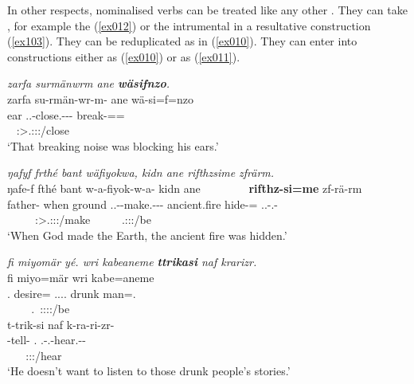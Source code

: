 In other respects, nominalised verbs can be treated like any other . They can take , for example the  (\ref{ex012}) or the intrumental in a resultative construction (\ref{ex103}). They can be reduplicated as in (\ref{ex010}). They can enter into  constructions either as  (\ref{ex010}) or as  (\ref{ex011}).

\begin{exe}
	\ex \textit{zarfa surmänwrm ane \textbf{wäsifnzo}.}\\
	\glll zarfa su-rmän-wr-m-\Zero{} ane wä-si=f=nzo\\
	ear \Tsg.\Masc.\Betatwo-close.\Ext-\Ndu-\Dur-\Stnsg{} \Dem{} break-\Nmlz{}=\Erg{}=\Only{}\\
	~ {\Stsg:\Sbj>\Tsg.\Masc:\Obj:\Pst:\Dur/close} ~ ~\\
	\trans `That breaking noise was blocking his ears.' 
	\label{ex012}
\end{exe}
\begin{exe}
	\ex \emph{ŋafyf frthé bant wäfiyokwa, kidn ane rifthzsime zfrärm.}\\
	\glll ŋafe-f fthé bant w-a-fiyok-w-a-\Zero{} kidn ane~~~~~~~~  \textbf{rifthz-si=me} zf-rä-rm\\
	father-\Erg{} when ground \Tsg.\F.\Alph-\Vc-make.\Ext-\Ndu-\Pst-\Stsg{} ancient.fire \Dem{} hide-\Nmlz{}=\Ins{} \Tsg.\F.\Betatwo-\Cop.\Ndu-\Dur\\
	~ ~ ~ {\Stsg:\Sbj>\Tsg.\F:\Obj:\Pst:\Ipfv/make} ~ ~ ~ {\Tsg.\F:\Sbj:\Pst:\Dur/be}\\
	\trans `When God made the Earth, the ancient fire was hidden.'\\ 
	\label{ex103}
\end{exe}
\begin{exe}
	\ex \textit{fi miyomär yé. wri kabeaneme \textbf{ttrikasi} naf krarizr.}\\
	\glll fi miyo=mär  wri kabe=aneme\\
	\Third{}.\Abs{} desire=\Priv{} \Tsg.\Masc.\Alph.\Cop.\Ndu{} drunk man=\Poss{}.\Nsg{}\\
	~ ~ {\Tsg~.\Masc~:\Alph:\Sbj:\Nonpast:\Ipfv/be} ~ ~\\
	\sn
	\glll t-trik-si naf k-ra-ri-zr-\Zero{}\\
	\Redup{}-tell-\Nmlz{} \Tsg{}.\Erg{} \M.\Bet-\Irr.\Vc-hear.\Ext-\Ndu-\Stsg{}\\
	~ ~ {\Stsg:\Sbj:\Irr:\Ipfv/hear}\\
	\trans `He doesn't want to listen to those drunk people's stories.'\\ 
	\label{ex010}
\end{exe}
